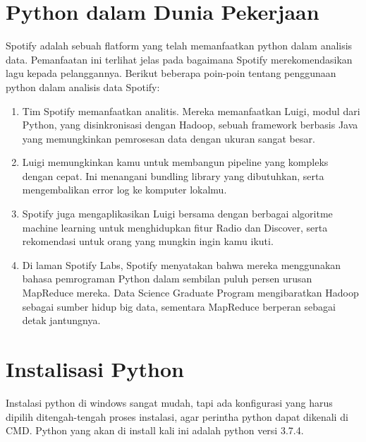 \documentclass{article}
\begin{document}
\section{Python dalam Dunia Pekerjaan}
Spotify adalah sebuah flatform yang telah memanfaatkan python dalam analisis data. Pemanfaatan ini terlihat jelas pada bagaimana Spotify merekomendasikan lagu kepada pelanggannya. Berikut beberapa poin-poin tentang penggunaan python dalam analisis data Spotify:
\begin{enumerate}
\item Tim Spotify memanfaatkan analitis. Mereka memanfaatkan Luigi, modul dari Python, yang disinkronisasi dengan Hadoop, sebuah framework berbasis Java yang memungkinkan pemrosesan data dengan ukuran sangat besar.
\item Luigi memungkinkan kamu untuk membangun pipeline yang kompleks dengan cepat. Ini menangani bundling library yang dibutuhkan, serta mengembalikan error log ke komputer lokalmu.
\item Spotify juga mengaplikasikan Luigi bersama dengan berbagai algoritme machine learning untuk menghidupkan fitur Radio dan Discover, serta rekomendasi untuk orang yang mungkin ingin kamu ikuti.
\item Di laman Spotify Labs, Spotify menyatakan bahwa mereka menggunakan bahasa pemrograman Python dalam sembilan puluh persen urusan MapReduce mereka. Data Science Graduate Program mengibaratkan Hadoop sebagai sumber hidup big data, sementara MapReduce berperan sebagai detak jantungnya.	
\end{enumerate}

\section{Instalisasi Python}
Instalasi python di windows sangat mudah, tapi ada konfigurasi yang harus dipilih ditengah-tengah proses instalasi, agar perintha python dapat dikenali di CMD. Python yang akan di install kali ini adalah python versi 3.7.4.
\end{document}
